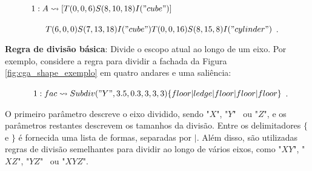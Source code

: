 \begin{description}
    \item[] \qquad \qquad $1: A \rightsquigarrow [ T(0,0,6) S(8,10,18) I("cube") ]$
    \item[] \qquad \qquad \, \, \, $T(6,0,0) S(7,13,18) I("cube") T(0,0,16) S(8,15,8) I("cylinder")$.
\end{description}

\vspace{0.5cm}

\textbf{Regra de divisão básica}: Divide o escopo atual ao longo de um eixo. Por exemplo, considere a regra para dividir a fachada da Figura \ref{fig:cga_shape_exemplo} em quatro andares e uma saliência:

\vspace{0.5cm}

\begin{description}
    \item[] \qquad \qquad $1: fac \rightsquigarrow Subdiv("Y",3.5,0.3,3,3,3)\{ floor | ledge | floor | floor | floor \}$.
\end{description}

\vspace{0.5cm}

O primeiro parâmetro descreve o eixo dividido, sendo "$X$", "$Y$" \, ou "$Z$", e os parâmetros restantes descrevem os tamanhos da divisão. Entre os delimitadores $\{$ e $\}$ é fornecida uma lista de formas, separadas por $|$. Além disso, são utilizadas regras de divisão semelhantes para dividir ao longo de vários eixos, como "$XY$", "$XZ$", "$YZ$" \, ou "$XYZ$".

\begin{figure}[h!]
	\centering
	\captionsetup{width=15cm}
	{}	
\end{figure}


